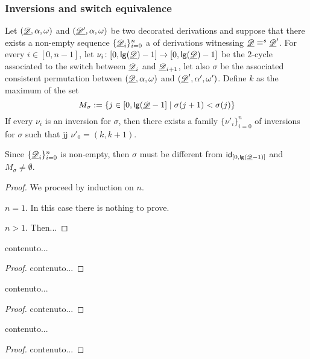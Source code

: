 \subsubsection{Inversions and switch equivalence}

\begin{lemma} Let $(\underline{\mathscr{D}}, \alpha, \omega)$ and $(\underline{\mathscr{D'}}, \alpha, \omega)$ be two decorated derivations and suppose that there exists a non-empty sequence $\{\underline{\mathscr{D}}_i\}_{i=0}^n$ a of derivations witnessing $\underline{\mathscr{D}}\equiv^s \underline{\mathscr{D}}'$. For every $i\in [0,n-1]$, let $\nu_i\colon [0, \mathsf{lg}(\underline{\mathscr{D}})-1]\to [0, \mathsf{lg}(\underline{\mathscr{D}})-1]$ be the $2$-cycle associated to the switch between $\underline{\mathscr{D}}_i$ and $\underline{\mathscr{D}}_{i+1}$, let also $\sigma$ be the associated consistent permutation between $(\underline{\mathscr{D}}, \alpha, \omega)$ and $(\underline{\mathscr{D}}', \alpha', \omega')$. Define $k$ as the maximum of the set
\[M_\sigma:=\{j\in [0, \mathsf{lg}(\underline{\mathscr{D}}-1] \mid \sigma(j+1) < \sigma(j) \}\]
If every $\nu_i$ is an inversion for $\sigma$, then there exists a family $\{\nu'_i\}_{i=0}^n$ of inversions for $\sigma$ such that jj $\nu'_0=(k, k+1)$.
\end{lemma}
\begin{remark}
	Since $\{\underline{\mathscr{D}}_i\}_{i=0}^n$ is non-empty, then $\sigma$ must be different from $\mathsf{id}_{[0, \mathsf{lg}(\underline{\mathscr{D}}-1)]}$ and $M_{\sigma}\neq \emptyset$.
\end{remark}
\begin{proof}
	We proceed by induction on $n$.
	
	\smallskip\noindent $n=1$. In this case there is nothing to prove.
	
	\smallskip \noindent $n>1$. Then...
\end{proof}

\begin{corollary}
	contenuto...
\end{corollary}
\begin{proof}
	contenuto...
\end{proof}


\begin{corollary}
	contenuto...
\end{corollary}
\begin{proof}
	contenuto...
\end{proof}



\begin{corollary}
	contenuto...
\end{corollary}
\begin{proof}
	contenuto...
\end{proof}



